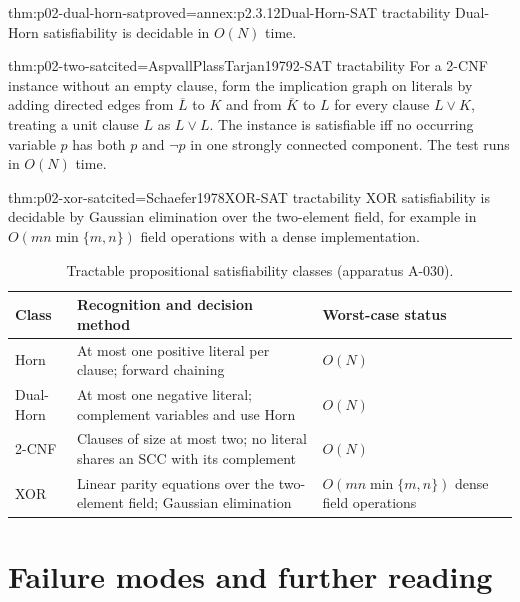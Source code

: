 \begin{hbcorollary}{thm:p02-dual-horn-sat}{proved=annex:p2.3.12}{Dual-Horn-SAT tractability}
Dual-Horn satisfiability is decidable in \(O(N)\) time.
\end{hbcorollary}

\begin{hbtheorem}{thm:p02-two-sat}{cited=AspvallPlassTarjan1979}{2-SAT tractability}
For a 2-CNF instance without an empty clause, form the implication graph on
literals by adding directed edges from \(\overline L\) to \(K\) and from
\(\overline K\) to \(L\) for every clause \(L\lor K\), treating a unit clause
\(L\) as \(L\lor L\).  The instance
is satisfiable iff no occurring variable \(p\) has both \(p\) and \(\neg p\)
in one strongly connected component.  The test runs in \(O(N)\) time.
\end{hbtheorem}

\begin{hbtheorem}{thm:p02-xor-sat}{cited=Schaefer1978}{XOR-SAT tractability}
XOR satisfiability is decidable by Gaussian elimination over the two-element
field, for example in \(O(mn\min\{m,n\})\) field operations with a dense
implementation.
\end{hbtheorem}

\begin{table}[tp]
\centering
\small
\begin{tabular}{@{}p{}p{}p{}@{}}
\toprule
Class & Recognition and decision method & Worst-case status \\
\midrule
Horn & At most one positive literal per clause; forward chaining & \(O(N)\) \\
Dual-Horn & At most one negative literal; complement variables and use Horn & \(O(N)\) \\
2-CNF & Clauses of size at most two; no literal shares an SCC with its complement & \(O(N)\) \\
XOR & Linear parity equations over the two-element field; Gaussian elimination & \(O(mn\min\{m,n\})\) dense field operations \\
\bottomrule
\end{tabular}
\caption{Tractable propositional satisfiability classes (apparatus A-030).}
\label{tab:p02-tractable-sat}
\end{table}

\section{Failure modes and further reading}
\label{sec:p02-prop-failure-modes}

